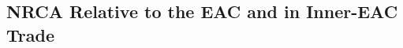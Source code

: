 \documentclass[a4paper]{article}
\begin{document}


%



\subsection{NRCA Relative to the EAC and in Inner-EAC Trade}
\end{document}
